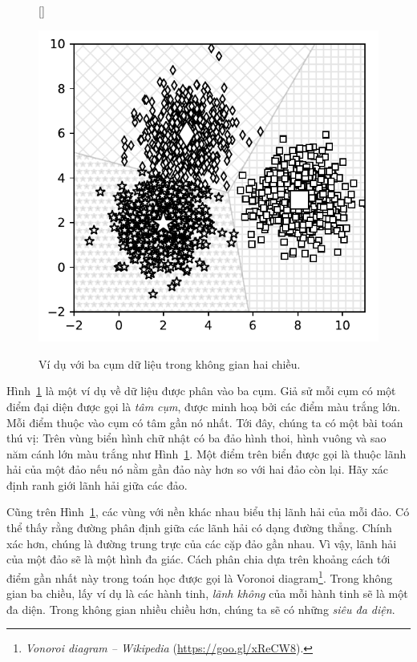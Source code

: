\begin{figure}[t]
[\FBwidth]
{\caption{
Ví dụ với ba cụm dữ liệu trong không gian hai chiều.
}
\label{fig:4_1}}
{ %
\includegraphics[width=.5\textwidth]{ebookML_src/src/kmeans/ex_5notitle.pdf}
}
\end{figure}

Hình~\ref{fig:4_1} là một ví dụ về dữ liệu được phân vào ba cụm. Giả sử mỗi cụm
có một điểm đại diện được gọi là \textit{tâm cụm}, được minh hoạ bởi các điểm
màu trắng lớn. Mỗi điểm thuộc vào cụm có tâm gần nó nhất. Tới đây, chúng ta có
một bài toán thú vị: {Trên vùng biển hình chữ nhật có ba đảo hình thoi, hình
vuông và sao năm cánh lớn màu trắng như Hình~\ref{fig:4_1}. Một điểm trên biển
được gọi là thuộc lãnh hải của một đảo nếu nó nằm gần đảo này hơn so với hai đảo
còn lại. Hãy xác định ranh giới lãnh hải giữa các đảo.}

Cũng trên Hình~\ref{fig:4_1}, các vùng với nền khác nhau biểu thị lãnh hải của
mỗi đảo. Có thể thấy rằng đường phân định giữa các lãnh hải có dạng đường
thẳng. Chính xác hơn, chúng là đường trung trực của các cặp đảo gần nhau. Vì
vậy, lãnh hải của một đảo sẽ là một hình đa giác. Cách phân chia dựa trên khoảng
cách tới điểm gần nhất này trong toán học được gọi là Voronoi
diagram\footnote{\textit{Vonoroi diagram -- Wikipedia}
(\url{https://goo.gl/xReCW8}).}. Trong không gian ba chiều, lấy ví dụ là các
hành tinh, \textit{lãnh không} của mỗi hành tinh sẽ là một đa diện. Trong không
gian nhiều chiều hơn, chúng ta sẽ có những \textit{siêu đa diện}.

